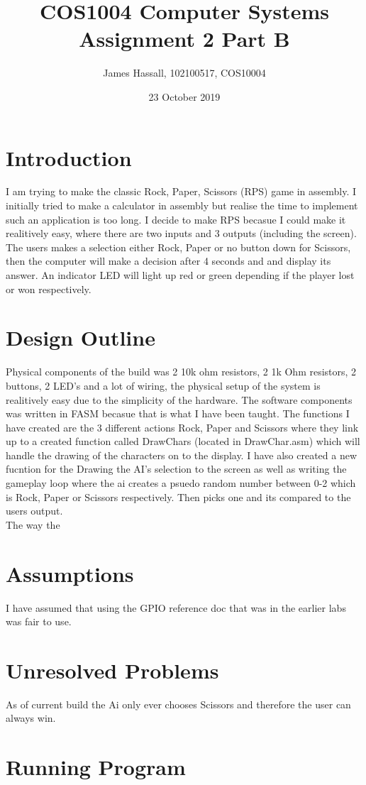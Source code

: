 \documentclass{article}
\title{COS1004 Computer Systems Assignment 2 Part B}
\author{James Hassall, 102100517, COS10004}
\date{23 October 2019}
\begin{document}
\maketitle

\pagebreak
\section*{Introduction}
I am trying to make the classic Rock, Paper, Scissors (RPS) game in assembly. I initially tried to make
a calculator in assembly but realise the time to implement such an application is too long. I 
decide to make RPS becasue I could make it realitively easy, where there are two inputs and 3 outputs
(including the screen). The users makes a selection either Rock, Paper or no button down for Scissors, 
then the computer will make a decision after 4 seconds and and display its answer.  An indicator LED 
will light up red or green depending if the player lost or won respectively.

\section*{Design Outline}
Physical components of the build was 2 10k ohm resistors, 2 1k Ohm resistors, 2 buttons,
2 LED's and a lot of wiring, the physical setup of the system is realitively easy due to the simplicity
of the hardware. The software components was written in FASM becasue that is what I have been taught.
The functions I have created are the 3 different actions Rock, Paper and Scissors where they link up to
a created function called DrawChars (located in DrawChar.asm) which will handle the drawing of the characters
on to the display. I have also created a new fucntion for the Drawing the AI's selection to the screen 
as well as writing the gameplay loop where the ai creates a psuedo random number between 0-2 which is Rock, Paper
or Scissors respectively. Then picks one and its compared to the users output.
\\
The way the 

\section*{Assumptions}
I have assumed that using the GPIO reference doc that was in the earlier labs was fair to use.

\section*{Unresolved Problems}
As of current build the Ai only ever chooses Scissors and therefore the user can always win.

\pagebreak
\section*{Running Program}
\end{document}
